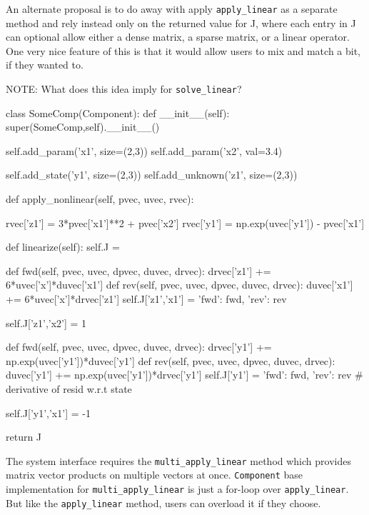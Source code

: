 \documentclass[12pt]{article}
\newcommand{\classname}[1]{\texttt{#1}}
\newcommand{\method}[1]{\texttt{#1}}
\begin{document}
An alternate proposal is to do away with apply \method{apply\_linear} as a separate method and
rely instead only on the returned value for J, where each entry in J can optional
allow either a dense matrix, a sparse matrix, or a linear operator. One very nice feature
of this is that it would allow users to mix and match a bit, if they wanted to.

NOTE: What does this idea imply for \method{solve\_linear}?

\begin{pyglist}[language=python]
    class SomeComp(Component):
        def __init__(self):
            super(SomeComp,self).__init__()

            self.add_param('x1', size=(2,3))
            self.add_param('x2', val=3.4)

            self.add_state('y1', size=(2,3))
            self.add_unknown('z1', size=(2,3))

        def apply_nonlinear(self, pvec, uvec, rvec):

            rvec['z1'] = 3*pvec['x1']**2 + pvec['x2']
            rvec['y1'] = np.exp(uvec['y1']) - pvec['x1']

        def linearize(self):
            self.J = {}


            def fwd(self, pvec, uvec, dpvec, duvec, drvec):
                drvec['z1'] += 6*uvec['x']*duvec['x1']
            def rev(self, pvec, uvec, dpvec, duvec, drvec):
                duvec['x1'] += 6*uvec['x']*drvec['z1']
            self.J['z1','x1'] = {'fwd': fwd, 'rev': rev}

            self.J['z1','x2'] = 1

            def fwd(self, pvec, uvec, dpvec, duvec, drvec):
                drvec['y1'] += np.exp(uvec['y1'])*duvec['y1']
            def rev(self, pvec, uvec, dpvec, duvec, drvec):
                duvec['y1'] += np.exp(uvec['y1'])*drvec['y1']
            self.J['y1'] = {'fwd': fwd, 'rev': rev} # derivative of resid w.r.t state

            self.J['y1','x1'] = -1

            return J

\end{pyglist}

The system interface requires the \method{multi\_apply\_linear}  method which provides matrix
vector products on multiple vectors at once. \classname{Component} base implementation
for \method{multi\_apply\_linear} is just a for-loop over \method{apply\_linear}. But like
the \method{apply\_linear} method, users can overload it if they choose.
\end{document}
